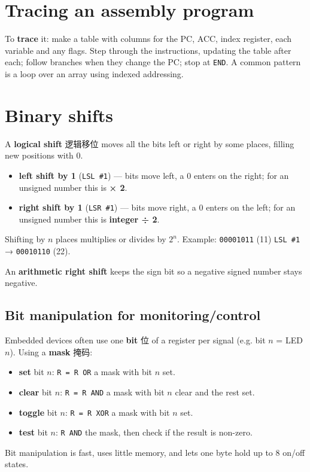 \documentclass[11pt]{article}
\begin{document}
\section*{Tracing an assembly program}

To \textbf{trace} it: make a table with columns for the PC, ACC, index register, each variable and any flags. Step through the instructions, updating the table after each; follow branches when they change the PC; stop at \texttt{END}. A common pattern is a loop over an array using indexed addressing.

\section*{Binary shifts}

A \textbf{logical shift} 逻辑移位 moves all the bits left or right by some places, filling new positions with 0.

\begin{itemize}
\item \textbf{left shift by 1} (\texttt{LSL \#1}) — bits move left, a 0 enters on the right; for an unsigned number this is \textbf{× 2}.

\item \textbf{right shift by 1} (\texttt{LSR \#1}) — bits move right, a 0 enters on the left; for an unsigned number this is \textbf{integer ÷ 2}.

\end{itemize}

Shifting by $n$ places multiplies or divides by $2^{n}$. Example: \texttt{00001011} (11) \texttt{LSL \#1} → \texttt{00010110} (22).

An \textbf{arithmetic right shift} keeps the sign bit so a negative signed number stays negative.

\subsection*{Bit manipulation for monitoring/control}

Embedded devices often use one \textbf{bit} 位 of a register per signal (e.g. bit $n$ = LED $n$). Using a \textbf{mask} 掩码:

\begin{itemize}
\item \textbf{set} bit $n$: \texttt{R = R OR} a mask with bit $n$ set.

\item \textbf{clear} bit $n$: \texttt{R = R AND} a mask with bit $n$ clear and the rest set.

\item \textbf{toggle} bit $n$: \texttt{R = R XOR} a mask with bit $n$ set.

\item \textbf{test} bit $n$: \texttt{R AND} the mask, then check if the result is non-zero.

\end{itemize}

Bit manipulation is fast, uses little memory, and lets one byte hold up to 8 on/off states.
\end{document}
